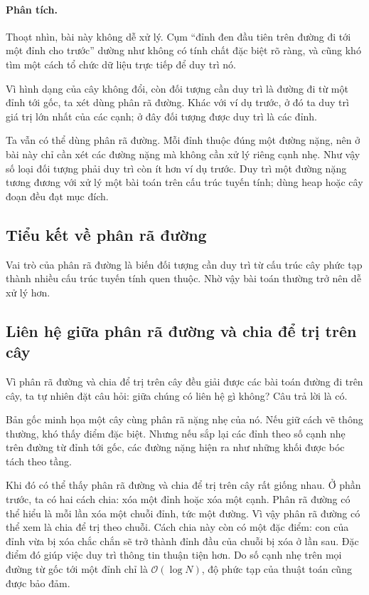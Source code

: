 \documentclass[11pt]{article}
\newcommand{\Oh}{\mathcal{O}}
\begin{document}
\paragraph{Phân tích.}
Thoạt nhìn, bài này không dễ xử lý. Cụm ``đỉnh đen đầu tiên trên đường đi tới
một đỉnh cho trước'' dường như không có tính chất đặc biệt rõ ràng, và cũng
khó tìm một cách tổ chức dữ liệu trực tiếp để duy trì nó.

Vì hình dạng của cây không đổi, còn đối tượng cần duy trì là đường đi từ một
đỉnh tới gốc, ta xét dùng phân rã đường. Khác với ví dụ trước, ở đó ta duy trì
giá trị lớn nhất của các cạnh; ở đây đối tượng được duy trì là các đỉnh.

Ta vẫn có thể dùng phân rã đường. Mỗi đỉnh thuộc đúng một đường nặng, nên ở
bài này chỉ cần xét các đường nặng mà không cần xử lý riêng cạnh nhẹ. Như vậy
số loại đối tượng phải duy trì còn ít hơn ví dụ trước. Duy trì một đường nặng
tương đương với xử lý một bài toán trên cấu trúc tuyến tính; dùng heap hoặc
cây đoạn đều đạt mục đích.

\subsection{Tiểu kết về phân rã đường}

Vai trò của phân rã đường là biến đối tượng cần duy trì từ cấu trúc cây phức
tạp thành nhiều cấu trúc tuyến tính quen thuộc. Nhờ vậy bài toán thường trở
nên dễ xử lý hơn.

\subsection{Liên hệ giữa phân rã đường và chia để trị trên cây}

Vì phân rã đường và chia để trị trên cây đều giải được các bài toán đường đi
trên cây, ta tự nhiên đặt câu hỏi: giữa chúng có liên hệ gì không? Câu trả lời
là có.

Bản gốc minh họa một cây cùng phân rã nặng nhẹ của nó. Nếu giữ cách vẽ thông
thường, khó thấy điểm đặc biệt. Nhưng nếu sắp lại các đỉnh theo số cạnh nhẹ
trên đường từ đỉnh tới gốc, các đường nặng hiện ra như những khối được bóc
tách theo tầng.

Khi đó có thể thấy phân rã đường và chia để trị trên cây rất giống nhau. Ở
phần trước, ta có hai cách chia: xóa một đỉnh hoặc xóa một cạnh. Phân rã đường
có thể hiểu là mỗi lần xóa một chuỗi đỉnh, tức một đường. Vì vậy phân rã
đường có thể xem là chia để trị theo chuỗi. Cách chia này còn có một đặc điểm:
con của đỉnh vừa bị xóa chắc chắn sẽ trở thành đỉnh đầu của chuỗi bị xóa ở
lần sau. Đặc điểm đó giúp việc duy trì thông tin thuận tiện hơn. Do số cạnh
nhẹ trên mọi đường từ gốc tới một đỉnh chỉ là \(\Oh(\log N)\), độ phức tạp của
thuật toán cũng được bảo đảm.
\end{document}
